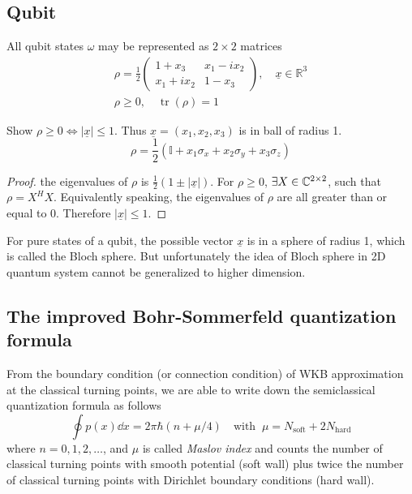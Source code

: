 \documentclass[10pt]{article}
\begin{document}
	\subsection{Qubit}
	All qubit states $\omega$ may be represented as $2 \times 2$ matrices
	\begin{gather}
		\rho = \frac{1}{2}
		\begin{pmatrix}
			1 + x_3 & x_1 - i x_2 \\
			x_1 + i x_2 & 1 - x_3
		\end{pmatrix} , \quad \underline{x} \in \mathbb{R}^3\\
		\rho \ge 0 , \quad \operatorname{tr}(\rho) = 1
	\end{gather}
	\begin{proposition}
		Show $\rho \ge 0 \Leftrightarrow |\underline{x}| \le 1$. Thus $\underline{x} = (x_1, x_2, x_3)$ is in ball of radius 1.
		\begin{equation}
			\rho = \frac{1}{2}(\mathbb{I} + x_1 \sigma_x + x_2 \sigma_y + x_3 \sigma_z)
		\end{equation}
	\end{proposition}
	\begin{proof}
		the eigenvalues of $\rho$ is $\frac{1}{2} (1 \pm |\underline{x}|)$. For $\rho \ge 0$, $\exists X \in {\mathbb{C}}^{2 \times 2}$, such that $\rho = X^H X$.
		Equivalently speaking, the eigenvalues of $\rho$ are all greater than or equal to 0. Therefore $|\underline{x}| \le 1$.
	\end{proof}
	For pure states of a qubit, the possible vector $\underline{x}$ is in a sphere of radius 1, which is called the Bloch sphere. But unfortunately the idea of Bloch sphere in 2D quantum system cannot be generalized to higher dimension.

	\subsection{The improved Bohr-Sommerfeld quantization formula}
	\begin{theorem}
		From the boundary condition (or connection condition) of WKB approximation at the classical turning points, we are able to write down the semiclassical quantization formula as follows
		\begin{equation}
			\oint p(x) \dd x = 2 \pi \hbar (n + \mu/4) \quad \text{with } \ \mu = N_{\text{soft}} + 2N_{\text{hard}}
		\end{equation}
		where $n = 0,1,2,\dots$, and $\mu$ is called \textit{Maslov index} and counts the number of classical turning points with smooth potential (soft wall) plus twice the number of classical turning points with Dirichlet boundary conditions (hard wall).
	\end{theorem}
\end{document}
